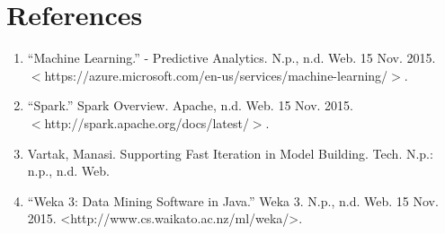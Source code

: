 \documentclass[../proposal.tex]{subfiles}
\begin{document}
\section{References}

\begin{enumerate}[topsep=0pt,itemsep=-1ex,partopsep=1ex,parsep=1ex]


\item ``Machine Learning.'' - Predictive Analytics. N.p., n.d. Web. 15 Nov. 2015. \\
$<$https://azure.microsoft.com/en-us/services/machine-learning/$>$.

\item ``Spark.'' Spark Overview. Apache, n.d. Web. 15 Nov. 2015. \\
$<$http://spark.apache.org/docs/latest/$>$.

\item Vartak, Manasi. Supporting Fast Iteration in Model Building. Tech. N.p.: n.p.,
n.d. Web.

\item ``Weka 3: Data Mining Software in Java.'' Weka 3. N.p., n.d. Web. 15 Nov. 2015.
<http://www.cs.waikato.ac.nz/ml/weka/>.

\end{enumerate}
\end{document}
